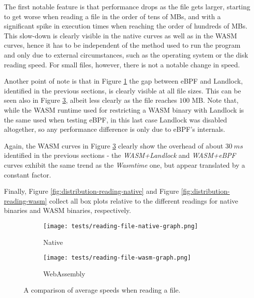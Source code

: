 The first notable feature is that performance drops as the file gets larger,
starting to get worse when reading a file in the order of tens of MBs, and with a significant
spike in execution times when reaching the order of hundreds of MBs.
This slow-down is clearly visible in the native curves as well as in the WASM curves,
hence it has to be independent of the method used to run the
program and only due to external circumstances, such as the operating system or the disk reading speed.
For small files, however, there is not a notable change in speed.

Another point of note is that in Figure \ref{fig:avg-comparison-native-speed} the gap between eBPF and Landlock,
identified in the previous sections, is clearly visible at all file sizes.
This can be seen also in Figure \ref{fig:avg-comparison-wasm-speed}, albeit less clearly as the file reaches $100$ MB.
Note that, while the WASM runtime used for restricting a WASM binary with Landlock is the same used when testing eBPF,
in this last case Landlock was disabled altogether, so any performance difference is only due to eBPF's internals.

Again, the WASM curves in Figure \ref{fig:avg-comparison-wasm-speed} clearly show the overhead
of about $30\ ms$ identified in the previous sections - the \textit{WASM+Landlock} and \textit{WASM+eBPF} curves
exhibit the same trend as the \textit{Wasmtime} one, but appear translated by a constant factor.

Finally, Figure \ref{fig:distribution-reading-native} and Figure \ref{fig:distribution-reading-wasm}
collect all box plots relative to the different readings for native binaries and WASM binaries, respectively.

\begin{figure}[ht!]
  \centering

  \begin{subfigure}[b]{0.49\linewidth}
    \centering
    \texttt{[image: tests/reading-file-native-graph.png]}
    \caption{Native}
    \label{fig:avg-comparison-native-speed}
  \end{subfigure}
  \begin{subfigure}[b]{0.49\linewidth}
    \centering
    \texttt{[image: tests/reading-file-wasm-graph.png]}
    \caption{WebAssembly}
    \label{fig:avg-comparison-wasm-speed}
  \end{subfigure}

  \caption{A comparison of average speeds when reading a file.}
\end{figure}

